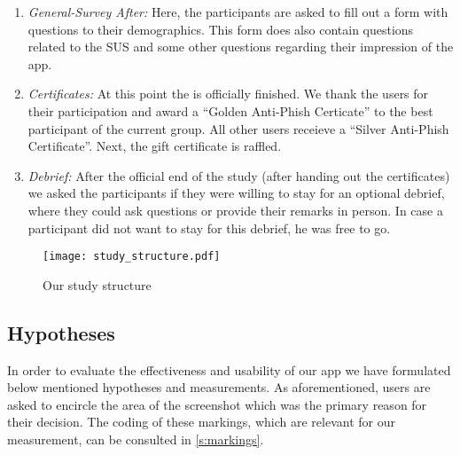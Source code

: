 \begin{enumerate}
	\item \textit{General-Survey After:} Here, the participants are asked to fill out a form with questions to their demographics.
 This form does also contain questions related to the SUS and some other questions regarding their impression of the app.
	
	\item \textit{Certificates:} At this point the is officially finished.
We thank the users for their participation and award a ``Golden Anti-Phish Certicate'' to the best participant of the current group.
All other users receieve a ``Silver Anti-Phish Certificate''.
Next, the gift certificate is raffled.

	\item \textit{Debrief:} After the official end of the study (after handing out the certificates) we asked the participants if they were willing to stay for an optional debrief, where they could ask questions or provide their remarks in person. In case a participant did not want to stay for this debrief, he was free to go.
\end{enumerate}



\begin{figure}[hHtbp]
\centering
\texttt{[image: study\_structure.pdf]}%
\caption{Our study structure}%
\label{fig:study_structure}%
\end{figure}

\subsection{Hypotheses}
In order to evaluate the effectiveness and usability of our app we have formulated below mentioned hypotheses and measurements.
As aforementioned, users are asked to encircle the area of the screenshot which was the primary reason for their decision.
The coding of these markings, which are relevant for our measurement, can be consulted in \autoref{s:markings}.


